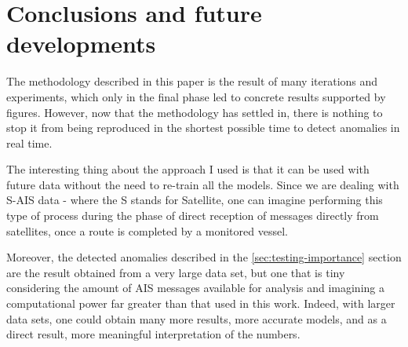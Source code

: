 \chapter{Conclusions and future developments}
\label{ch:conclusions}

The methodology described in this paper is the result of many iterations and experiments, which only in the final phase led to concrete results supported by figures. However, now that the methodology has settled in, there is nothing to stop it from being reproduced in the shortest possible time to detect anomalies in real time.

The interesting thing about the approach I used is that it can be used with future data without the need to re-train all the models. Since we are dealing with S-AIS data - where the S stands for Satellite, one can imagine performing this type of process during the phase of direct reception of messages directly from satellites, once a route is completed by a monitored vessel.

Moreover, the detected anomalies described in the \ref{sec:testing-importance} section are the result obtained from a very large data set, but one that is tiny considering the amount of AIS messages available for analysis and imagining a computational power far greater than that used in this work. Indeed, with larger data sets, one could obtain many more results, more accurate models, and as a direct result, more meaningful interpretation of the numbers.